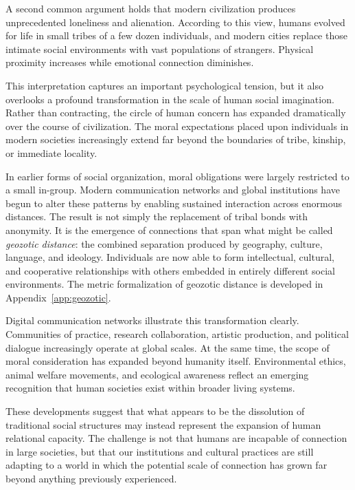 \documentclass[12pt]{article}
\begin{document}
A second common argument holds that modern civilization produces unprecedented loneliness and alienation. According to this view, humans evolved for life in small tribes of a few dozen individuals, and modern cities replace those intimate social environments with vast populations of strangers. Physical proximity increases while emotional connection diminishes.

This interpretation captures an important psychological tension, but it also overlooks a profound transformation in the scale of human social imagination. Rather than contracting, the circle of human concern has expanded dramatically over the course of civilization. The moral expectations placed upon individuals in modern societies increasingly extend far beyond the boundaries of tribe, kinship, or immediate locality.

In earlier forms of social organization, moral obligations were largely restricted to a small in-group. Modern communication networks and global institutions have begun to alter these patterns by enabling sustained interaction across enormous distances. The result is not simply the replacement of tribal bonds with anonymity. It is the emergence of connections that span what might be called \emph{geozotic distance}: the combined separation produced by geography, culture, language, and ideology. Individuals are now able to form intellectual, cultural, and cooperative relationships with others embedded in entirely different social environments. The metric formalization of geozotic distance is developed in Appendix~\ref{app:geozotic}.

Digital communication networks illustrate this transformation clearly. Communities of practice, research collaboration, artistic production, and political dialogue increasingly operate at global scales. At the same time, the scope of moral consideration has expanded beyond humanity itself. Environmental ethics, animal welfare movements, and ecological awareness reflect an emerging recognition that human societies exist within broader living systems.

These developments suggest that what appears to be the dissolution of traditional social structures may instead represent the expansion of human relational capacity. The challenge is not that humans are incapable of connection in large societies, but that our institutions and cultural practices are still adapting to a world in which the potential scale of connection has grown far beyond anything previously experienced.
\end{document}
